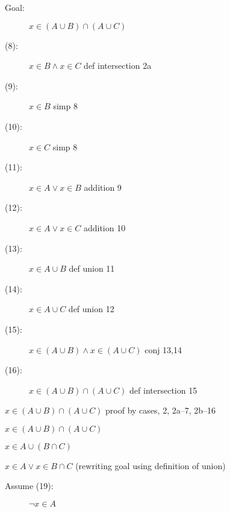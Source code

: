 \documentclass[12pt]{book}
\begin{document}
\begin{description}
\begin{description}
\begin{description}
\item[Goal:]  $x \in (A \cup B) \cap (A \cup C)$

\item[(8):] $x \in B \wedge x \in C$ def intersection 2a

\item[(9):]  $x \in B$ simp 8

\item[(10):]  $x \in C$ simp 8

\item[(11):]  $x \in A \vee x \in B$  addition 9

\item[(12):]  $x \in A \vee x \in C$  addition 10

\item [(13):]  $x \in A \cup B$ def union 11

\item[(14):]  $x \in A \cup C$  def union 12

\item[(15):]  $x \in  (A \cup B) \wedge x \in (A \cup C)$  conj 13,14

\item[(16):]   $x \in  (A \cup B) \cap  (A \cup C)$ def intersection 15
 

\end{description}

\item[(17):] $x \in  (A \cup B) \cap  (A \cup C)$ proof by cases, 2, 2a--7, 2b--16

\end{description}

\newpage

\item[Part II:]

\begin{description}

\item

\item[Assume (18):]  $x \in  (A \cup B) \cap  (A \cup C)$

\item[Goal:]  $x \in A \cup (B \cap C)$

\item[Goal:]  $x \in A \vee x \in B \cap C$ (rewriting goal using definition of union)

\begin{description}

\item[Assume (19):]  $\neg x \in A$


\end{description}
\end{description}
\end{description}
\end{document}
